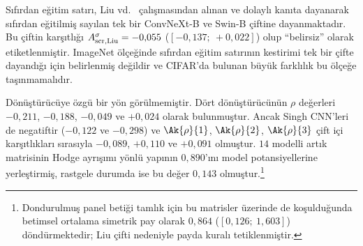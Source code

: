 Sıfırdan eğitim satırı, Liu vd.~\cite{liu2023comprehensive} çalışmasından alınan ve dolaylı kanıta dayanarak sıfırdan eğitilmiş sayılan tek bir ConvNeXt-B ve Swin-B çiftine dayanmaktadır. Bu çiftin karşıtlığı $A^{\sigma}_{\mathrm{scr,Liu}} = -0{,}055$ ($[-0{,}137;\ +0{,}022]$) olup ``belirsiz'' olarak etiketlenmiştir. ImageNet ölçeğinde sıfırdan eğitim satırının kestirimi tek bir çifte dayandığı için belirlenmiş değildir ve CIFAR'da bulunan büyük farklılık bu ölçeğe taşınmamalıdır.

Dönüştürücüye özgü bir yön görülmemiştir. Dört dönüştürücünün $\rho$ değerleri $-0{,}211$, $-0{,}188$, $-0{,}049$ ve $+0{,}024$ olarak bulunmuştur. Ancak Singh CNN'leri de negatiftir ($-0{,}122$ ve $-0{,}298$) ve $\Ak{\rho}{1}$, $\Ak{\rho}{2}$, $\Ak{\rho}{3}$ çift içi karşıtlıkları sırasıyla $-0{,}089$, $+0{,}110$ ve $+0{,}091$ olmuştur. $14$ modelli artık matrisinin Hodge ayrışımı yönlü yapının $0{,}890$'ını model potansiyellerine yerleştirmiş, rastgele durumda ise bu değer $0{,}143$ olmuştur.\footnote{Dondurulmuş panel betiği tamlık için bu matrisler üzerinde de koşulduğunda betimsel ortalama simetrik pay olarak $0{,}864$ ($[0{,}126;\ 1{,}603]$) döndürmektedir; Liu çifti nedeniyle payda kuralı tetiklenmiştir.}

